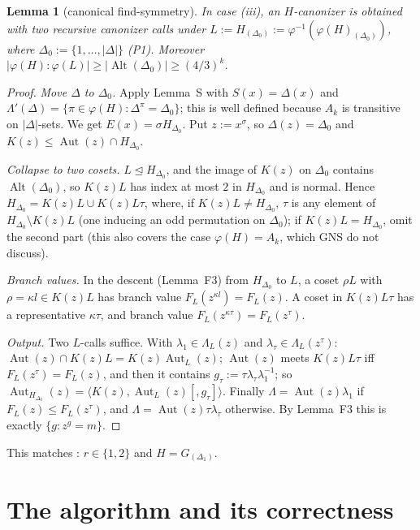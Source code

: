 \documentclass[11pt]{article}
\theoremstyle{plain}
\newtheorem{lemma}[theorem]{Lemma}
\theoremstyle{definition}
\theoremstyle{remark}
\theoremstyle{named}
\theoremstyle{namedrm}
\newcommand{\Alt}{\operatorname{Alt}}
\newcommand{\Aut}{\operatorname{Aut}}
\begin{document}
\begin{lemma}[canonical find-symmetry]\label{lem:K}
In case (iii), an $H$-canonizer is obtained with two recursive canonizer calls under
$L:=H_{(\Delta_0)}:=\varphi^{-1}(\varphi(H)_{(\Delta_0)})$, where $\Delta_0:=\{1,\dots,|\Delta|\}$ (P1). Moreover
$|\varphi(H):\varphi(L)|\ge|\Alt(\Delta_0)|\ge(4/3)^k$.
\end{lemma}
\begin{proof}
\emph{Move $\Delta$ to $\Delta_0$.} Apply Lemma~S with $S(x)=\Delta(x)$ and
$\Lambda'(\Delta)=\{\pi\in\varphi(H):\Delta^\pi=\Delta_0\}$; this is well defined because $A_k$ is transitive on
$|\Delta|$-sets. We get $E(x)=\sigma H_{\Delta_0}$. Put $z:=x^\sigma$, so $\Delta(z)=\Delta_0$ and
$K(z)\le\Aut(z)\cap H_{\Delta_0}$.

\emph{Collapse to two cosets.} $L\trianglelefteq H_{\Delta_0}$, and the image of $K(z)$ on $\Delta_0$ contains
$\Alt(\Delta_0)$, so $K(z)L$ has index at most $2$ in $H_{\Delta_0}$ and is normal. Hence
$H_{\Delta_0}=K(z)L\cup K(z)L\tau$, where, if $K(z)L\ne H_{\Delta_0}$, $\tau$ is any element of
$H_{\Delta_0}\setminus K(z)L$ (one inducing an odd permutation on $\Delta_0$); if $K(z)L=H_{\Delta_0}$, omit the
second part (this also covers the case $\varphi(H)=A_k$, which GNS do not discuss).

\emph{Branch values.} In the descent (Lemma~F3) from $H_{\Delta_0}$ to $L$, a coset $\rho L$ with
$\rho=\kappa l\in K(z)L$ has branch value $F_L(z^{\kappa l})=F_L(z)$. A coset in $K(z)L\tau$ has a representative
$\kappa\tau$, and branch value $F_L(z^{\kappa\tau})=F_L(z^\tau)$.

\emph{Output.} Two $L$-calls suffice. With $\lambda_1\in\Lambda_L(z)$ and $\lambda_\tau\in\Lambda_L(z^\tau)$:
$\Aut(z)\cap K(z)L=K(z)\Aut_L(z)$; $\Aut(z)$ meets $K(z)L\tau$ iff $F_L(z^\tau)=F_L(z)$, and then it contains
$g_\tau:=\tau\lambda_\tau\lambda_1^{-1}$; so $\Aut_{H_{\Delta_0}}(z)=\langle K(z),\Aut_L(z)[,g_\tau]\rangle$. Finally
$\Lambda=\Aut(z)\lambda_1$ if $F_L(z)\le F_L(z^\tau)$, and $\Lambda=\Aut(z)\tau\lambda_\tau$ otherwise. By Lemma~F3 this is
exactly $\{g:z^g=m\}$.
\end{proof}
This matches \cite[Lemma~6.9]{GNS}: $r\in\{1,2\}$ and $H=G_{(\Delta_1)}$.

\section{The algorithm and its correctness}\label{sec:algo}
\end{document}
